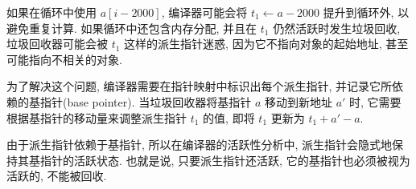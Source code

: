 如果在循环中使用 $a[i-2000]$, 编译器可能会将 $t_1 \leftarrow a - 2000$ 提升到循环外, 以避免重复计算. 如果循环中还包含内存分配, 并且在 $t_1$ 仍然活跃时发生垃圾回收, 垃圾回收器可能会被 $t_1$ 这样的派生指针迷惑, 因为它不指向对象的起始地址, 甚至可能指向不相关的对象. 

为了解决这个问题, 编译器需要在指针映射中标识出每个派生指针, 并记录它所依赖的基指针(base pointer). 当垃圾回收器将基指针 $a$ 移动到新地址 $a'$ 时, 它需要根据基指针的移动量来调整派生指针 $t_1$ 的值, 即将 $t_1$ 更新为 $t_1 + a' - a$. 

由于派生指针依赖于基指针, 所以在编译器的活跃性分析中, 派生指针会隐式地保持其基指针的活跃状态. 也就是说, 只要派生指针还活跃, 它的基指针也必须被视为活跃的, 不能被回收. 